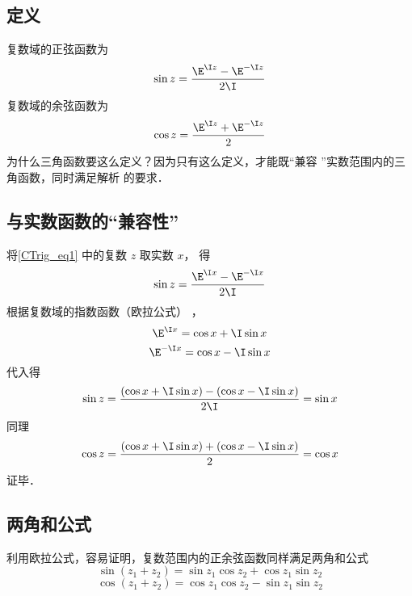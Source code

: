 
\subsection{定义}
复数域的正弦函数为
\begin{equation}\label{CTrig_eq1}
\sin z = \frac{\E^{\I z} - \E^{ - \I z}}{2\I}
\end{equation}
复数域的余弦函数为
\begin{equation}\label{CTrig_eq2}
\cos z = \frac{\E^{\I z} + \E^{ - \I z}}{2}
\end{equation}
为什么三角函数要这么定义？因为只有这么定义，才能既“兼容%
”实数范围内的三角函数，同时满足解析%
的要求．

\subsection{与实数函数的“兼容性”}
将\autoref{CTrig_eq1} 中的复数 $z$ 取实数 $x$， 得
\begin{equation}
\sin z = \frac{\E^{\I x} - \E^{ - \I x}}{2\I}
\end{equation} 
根据复数域的指数函数（欧拉公式）
，%
 \begin{equation}
{\E^{\I x}} = \cos x + \I\sin x
\end{equation} 
\begin{equation}
{\E^{ - \I x}} = \cos x - \I \sin x
\end{equation} 
代入得
\begin{equation}
\sin z = \frac{\left( {\cos x + \I\sin x} \right) - \left( {\cos x - \I\sin x} \right)}{2\I} = \sin x
\end{equation}  
同理
\begin{equation}
\cos z = \frac{\left( {\cos x + \I\sin x} \right) + \left( {\cos x - \I\sin x} \right)}{2} = \cos x
\end{equation}   
证毕．

\subsection{两角和公式}
利用欧拉公式，容易证明，复数范围内的正余弦函数同样满足两角和公式
\begin{equation}\label{CTrig_eq3}
\sin \left( {{z_1} + {z_2}} \right) = \sin {z_1}\cos {z_2} + \cos {z_1}\sin {z_2}
\end{equation}
\begin{equation}\label{CTrig_eq4}
\cos \left( {{z_1} + {z_2}} \right) = \cos {z_1}\cos {z_2} - \sin {z_1}\sin {z_2}
\end{equation}
